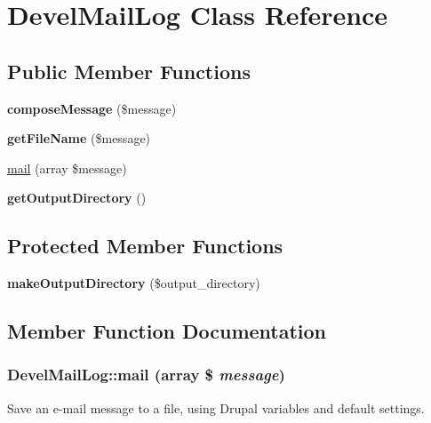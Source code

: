 \hypertarget{classDevelMailLog}{
\section{DevelMailLog Class Reference}
\label{classDevelMailLog}
}
\subsection*{Public Member Functions}
\begin{DoxyCompactItemize}
\item 
\hypertarget{classDevelMailLog_a7fc38d7076f8fc369f4a9fc59acd8fb2}{
{\bfseries composeMessage} (\$message)}
\label{classDevelMailLog_a7fc38d7076f8fc369f4a9fc59acd8fb2}

\item 
\hypertarget{classDevelMailLog_ac8750ec41508031f9dee0193e814d87a}{
{\bfseries getFileName} (\$message)}
\label{classDevelMailLog_ac8750ec41508031f9dee0193e814d87a}

\item 
\hyperlink{classDevelMailLog_a1179208e4b2b37addefcc9f8ed9be0b0}{mail} (array \$message)
\item 
\hypertarget{classDevelMailLog_a9fb9e9177ca1ce0e8af9bf8ea33513df}{
{\bfseries getOutputDirectory} ()}
\label{classDevelMailLog_a9fb9e9177ca1ce0e8af9bf8ea33513df}

\end{DoxyCompactItemize}
\subsection*{Protected Member Functions}
\begin{DoxyCompactItemize}
\item 
\hypertarget{classDevelMailLog_ab1adcc72358ae5771bec2a0a2af0c008}{
{\bfseries makeOutputDirectory} (\$output\_\-directory)}
\label{classDevelMailLog_ab1adcc72358ae5771bec2a0a2af0c008}

\end{DoxyCompactItemize}


\subsection{Member Function Documentation}
\hypertarget{classDevelMailLog_a1179208e4b2b37addefcc9f8ed9be0b0}{
\subsubsection[{mail}]{\setlength{\rightskip}{0pt plus 5cm}DevelMailLog::mail (array \$ {\em message})}}
\label{classDevelMailLog_a1179208e4b2b37addefcc9f8ed9be0b0}
Save an e-\/mail message to a file, using Drupal variables and default settings.

